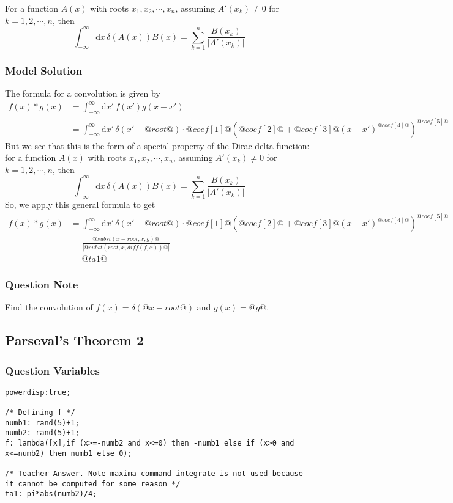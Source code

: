 \documentclass[a4paper,10pt]{article}
\begin{document}
For a function \(A(x)\) with roots \(x_1, x_2, \cdots, x_n\), assuming \(A'(x_k) \neq 0 \) for \(k=1,2,\cdots,n\), then \[ \int_{-\infty}^{\infty} \text{d}x \, \delta(A(x))B(x) = \sum_{k=1}^{n}\frac{B(x_k)}{|A'(x_k)|} \]
\subsubsection{Model Solution}
The formula for a convolution is given by \begin{align*} f(x) \ast g(x) &= \int_{-\infty}^{\infty}\text{d}x' \, f(x')g(x-x') \\ &= \int_{-\infty}^{\infty}\text{d}x' \, \delta(x'-@root@) \cdot @coef[1]@\left(@coef[2]@+@coef[3]@\left(x-x'\right)^{@coef[4]@}\right)^{@coef[5]@} \end{align*} But we see that this is the form of a special property of the Dirac delta function: for a function \(A(x)\) with roots \(x_1, x_2, \cdots, x_n\), assuming \(A'(x_k) \neq 0 \) for \(k=1,2,\cdots,n\), then \[ \int_{-\infty}^{\infty} \text{d}x \, \delta(A(x))B(x) = \sum_{k=1}^{n}\frac{B(x_k)}{|A'(x_k)|} \] So, we apply this general formula to get \begin{align*} f(x) \ast g(x) &= \int_{-\infty}^{\infty}\text{d}x' \, \delta(x'-@root@) \cdot @coef[1]@\left(@coef[2]@+@coef[3]@\left(x-x'\right)^{@coef[4]@}\right)^{@coef[5]@} \\ &= \frac{@subst(x-root,x,g)@}{|@subst(root,x,diff(f,x))@|} \\ &= @ta1@ \end{align*}
\subsubsection{Question Note}
Find the convolution of \(f(x)= \delta(@x-root@)\) and \( g(x) = @g@ \).

\subsection{Parseval's Theorem 2}
\subsubsection{Question Variables}
\begin{lstlisting}
powerdisp:true;

/* Defining f */
numb1: rand(5)+1;
numb2: rand(5)+1;
f: lambda([x],if (x>=-numb2 and x<=0) then -numb1 else if (x>0 and x<=numb2) then numb1 else 0);

/* Teacher Answer. Note maxima command integrate is not used because it cannot be computed for some reason */
ta1: pi*abs(numb2)/4;
\end{lstlisting}
\end{document}

